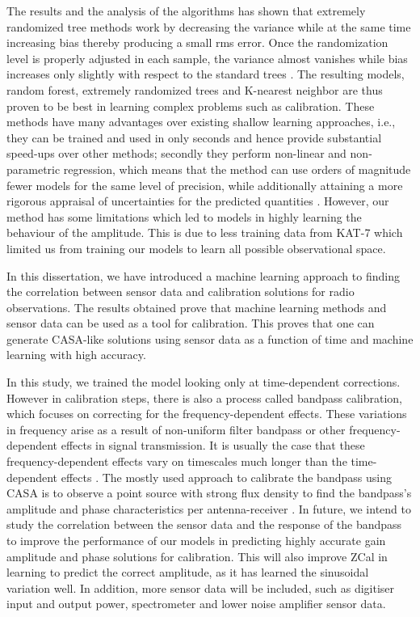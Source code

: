 The results and the analysis of the algorithms  has shown that extremely randomized tree methods work by decreasing the variance while at the same time increasing bias thereby producing a small rms error. Once the randomization level is properly adjusted in each sample, the variance almost vanishes while bias increases only slightly with respect to the standard trees \citep{geurts2006extremely}. The resulting models, random forest, extremely randomized trees and K-nearest neighbor are thus proven to be best in learning complex problems such as calibration. These methods have many advantages over
existing shallow learning approaches, i.e., they can be trained
and used in only seconds and hence provide substantial
speed-ups over other methods; secondly they perform non-linear and non-parametric regression, which means that the method can
use orders of magnitude fewer models for the same level
of precision, while additionally attaining a more rigorous
appraisal of uncertainties for the predicted quantities \citep{bellinger2016fundamental}. However, our method has some limitations which led to models in highly learning the behaviour of the amplitude. This is due to less training data from KAT-7 which limited us from training our models to learn all possible observational space.

In this dissertation, we have introduced a machine learning approach to finding the correlation between sensor data and calibration solutions for radio observations. The results obtained prove that machine learning  methods  and sensor data can be used as a tool for calibration. This proves that one can generate CASA-like solutions using sensor data as a function of time and machine learning with high accuracy.

In this study, we trained the model looking only at time-dependent corrections. However in calibration steps, there is also a process called bandpass calibration, which focuses on correcting for the frequency-dependent effects. These variations in frequency arise as a result of non-uniform filter bandpass or other frequency-dependent effects in signal transmission. It is usually the case that these frequency-dependent effects vary on timescales much longer than the time-dependent effects \citep{editioncasa}. The mostly used approach to calibrate the bandpass using CASA is to observe a point source with strong flux density to find the bandpass's amplitude and phase characteristics per antenna-receiver \citep{editioncasa}. In future, we intend to study the correlation between the sensor data and the response of the bandpass to improve the performance of our models in predicting highly accurate gain amplitude and phase solutions for calibration. This will also improve ZCal in learning to predict the correct amplitude, as it has learned the sinusoidal variation well. In addition, more sensor data will be included, such as digitiser input and output power, spectrometer and lower noise amplifier sensor data.  









